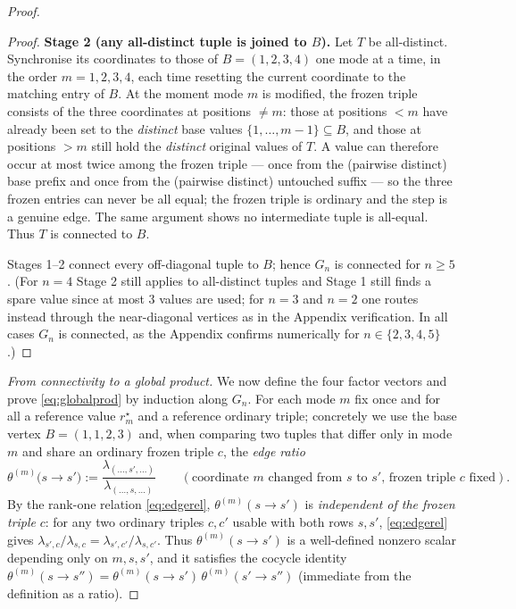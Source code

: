 \begin{proof}
\begin{proof}
\medskip\noindent\textbf{Stage 2 (any all-distinct tuple is joined to $B$).}
Let $T$ be all-distinct. Synchronise its coordinates to those of $B=(1,2,3,4)$ one mode at a
time, in the order $m=1,2,3,4$, each time resetting the current coordinate to the matching
entry of $B$. At the moment mode $m$ is modified, the frozen triple consists of the three
coordinates at positions $\ne m$: those at positions $<m$ have already been set to the
\emph{distinct} base values $\{1,\dots,m-1\}\subseteq B$, and those at positions $>m$ still
hold the \emph{distinct} original values of $T$. A value can therefore occur at most twice
among the frozen triple --- once from the (pairwise distinct) base prefix and once from the
(pairwise distinct) untouched suffix --- so the three frozen entries can never be all equal;
the frozen triple is ordinary and the step is a genuine edge. The same argument shows no
intermediate tuple is all-equal. Thus $T$ is connected to $B$.

\medskip
Stages 1--2 connect every off-diagonal tuple to $B$; hence $G_n$ is connected for $n\ge5$.
(For $n=4$ Stage 2 still applies to all-distinct tuples and Stage 1 still finds a spare value
since at most $3$ values are used; for $n=3$ and $n=2$ one routes instead through the
near-diagonal vertices as in the Appendix verification. In all cases $G_n$ is connected, as
the Appendix confirms numerically for $n\in\{2,3,4,5\}$.)
\end{proof}

\medskip\noindent\emph{From connectivity to a global product.}
We now define the four factor vectors and prove \eqref{eq:globalprod} by induction along
$G_n$. For each mode $m$ fix once and for all a reference value $r_m^\star$ and a reference
ordinary triple; concretely we use the base vertex $B=(1,1,2,3)$ and, when comparing two
tuples that differ only in mode $m$ and share an ordinary frozen triple $c$, the
\emph{edge ratio}
\begin{equation}\label{eq:edgeratio}
\theta^{(m)}\!\big(s\to s'\big):=\frac{\lambda_{(\dots,s',\dots)}}{\lambda_{(\dots,s,\dots)}}
\qquad(\text{coordinate $m$ changed from $s$ to $s'$, frozen triple $c$ fixed}).
\end{equation}
By the rank-one relation \eqref{eq:edgerel}, $\theta^{(m)}(s\to s')$ is \emph{independent of
the frozen triple} $c$: for any two ordinary triples $c,c'$ usable with both rows $s,s'$,
\eqref{eq:edgerel} gives $\lambda_{s',c}/\lambda_{s,c}=\lambda_{s',c'}/\lambda_{s,c'}$. Thus
$\theta^{(m)}(s\to s')$ is a well-defined nonzero scalar depending only on $m,s,s'$, and it
satisfies the cocycle identity $\theta^{(m)}(s\to s'')=\theta^{(m)}(s\to
s')\,\theta^{(m)}(s'\to s'')$ (immediate from the definition as a ratio).


\end{proof}
